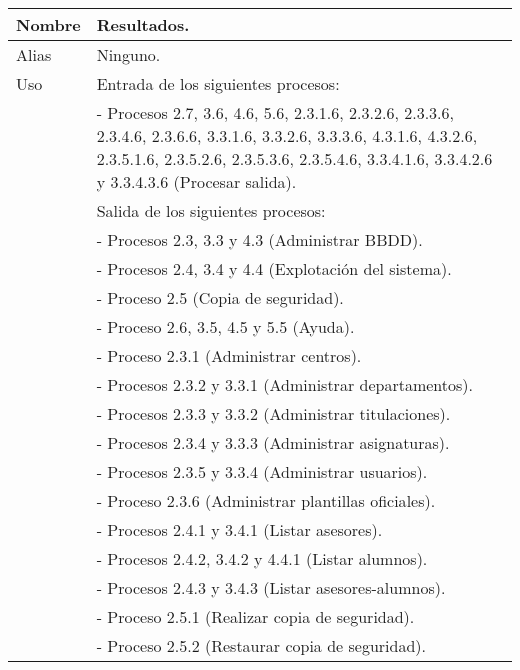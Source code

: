 \begin{center}
  \begin{longtable}{| l | p{9cm} |}
    \hline
    Nombre & \textbf{Resultados}.\\
    \hline
    Alias & Ninguno.\\
    \hline
    \multirow{1}{*}{Uso} & Entrada de los siguientes procesos:\\
                          & - Procesos 2.7, 3.6, 4.6, 5.6, 2.3.1.6, 2.3.2.6,
                          2.3.3.6, 2.3.4.6, 2.3.6.6, 3.3.1.6, 3.3.2.6, 3.3.3.6,
                          4.3.1.6, 4.3.2.6, 2.3.5.1.6, 2.3.5.2.6, 2.3.5.3.6,
                          2.3.5.4.6, 3.3.4.1.6, 3.3.4.2.6 y 3.3.4.3.6 (Procesar
                          salida).\\
                          & Salida de los siguientes procesos:\\
                          & - Procesos 2.3, 3.3 y 4.3 (Administrar BBDD).\\
                          & - Procesos 2.4, 3.4 y 4.4 (Explotación del sistema).\\
                          & - Proceso 2.5 (Copia de seguridad).\\
                          & - Proceso 2.6, 3.5, 4.5 y 5.5 (Ayuda).\\
                          & - Proceso 2.3.1 (Administrar centros).\\
                          & - Procesos 2.3.2 y 3.3.1 (Administrar departamentos).\\
                          & - Procesos 2.3.3 y 3.3.2 (Administrar titulaciones).\\
                          & - Procesos 2.3.4 y 3.3.3 (Administrar asignaturas).\\
                          & - Procesos 2.3.5 y 3.3.4 (Administrar usuarios).\\
                          & - Proceso 2.3.6 (Administrar plantillas oficiales).\\
                          & - Procesos 2.4.1 y 3.4.1 (Listar asesores).\\
                          & - Procesos 2.4.2, 3.4.2 y 4.4.1 (Listar alumnos).\\
                          & - Procesos 2.4.3 y 3.4.3 (Listar asesores-alumnos).\\
                          & - Proceso 2.5.1 (Realizar copia de seguridad).\\
                          & - Proceso 2.5.2 (Restaurar copia de seguridad).\\

\end{longtable}
\end{center}
